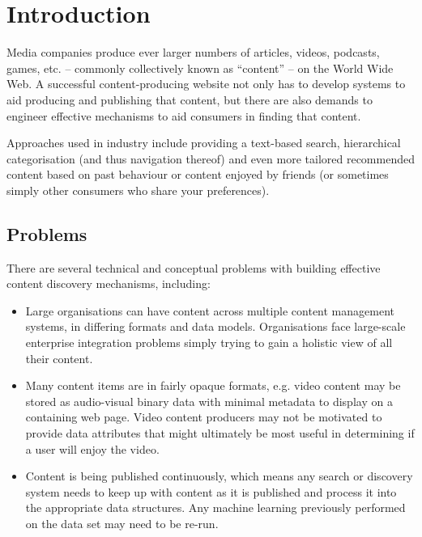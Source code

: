\chapter{Introduction}

Media companies produce ever larger numbers of articles, videos,
podcasts, games, etc. -- commonly collectively known as ``content'' --
on the World Wide Web. A successful content-producing website not only
has to develop systems to aid producing and publishing that content,
but there are also demands to engineer effective mechanisms to aid
consumers in finding that content.

Approaches used in industry include providing a text-based search,
hierarchical categorisation (and thus navigation thereof) and even
more tailored recommended content based on past behaviour or content
enjoyed by friends (or sometimes simply other consumers who share your
preferences).

\section{Problems}
\label{sec:intro-problems}

There are several technical and conceptual problems with building
effective content discovery mechanisms, including:

\begin{itemize}

\item Large organisations can have content across multiple content
  management systems, in differing formats and data models.
  Organisations face large-scale enterprise integration problems
  simply trying to gain a holistic view of all their content.

\item Many content items are in fairly opaque formats, e.g. video
  content may be stored as audio-visual binary data with minimal
  metadata to display on a containing web page. Video content
  producers may not be motivated to provide data attributes that might
  ultimately be most useful in determining if a user will enjoy the
  video.

\item Content is being published continuously, which means any search
  or discovery system needs to keep up with content as it is published
  and process it into the appropriate data structures. Any machine
  learning previously performed on the data set may need to be re-run.

\end{itemize}

